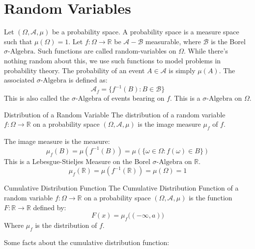 \section{Random Variables}
    Let $(\Omega,\mathcal{A},\mu)$ be a probability space.
    A probability space is a measure space such that
    $\mu(\Omega)=1$. Let $f:\Omega\rightarrow\mathbb{R}$ be
    $\mathcal{A}-\mathcal{B}$ measurable, where $\mathcal{B}$ is
    the Borel $\sigma\textrm{-Algebra}$. Such functions are called
    random-variables on $\Omega$. While there's nothing random
    about this, we use such functions to model problems in
    probability theory. The probability of an event
    $A\in\mathcal{A}$ is simply $\mu(A)$. The associated
    $\sigma\textrm{-Algebra}$ is defined as:
    \begin{equation}
        \mathcal{A}_{f}=\{f^{-1}(B):B\in\mathcal{B}\}
    \end{equation}
    This is also called the $\sigma\textrm{-Algebra}$ of events
    bearing on $f$. This is a $\sigma\textrm{-Algebra}$ on
    $\Omega$.
    \begin{ldefinition}{Distribution of a Random Variable}
        The distribution of a random variable
        $f:\Omega\rightarrow\mathbb{R}$ on a probability space
        $(\Omega,\mathcal{A},\mu)$ is the image measure
        $\mu_{f}$ of $f$.
    \end{ldefinition}
    The image measure is the measure:
    \begin{equation}
        \mu_{f}(B)=\mu(f^{-1}(B))
        =\mu(\{\omega\in\Omega:f(\omega)\in{B}\})
    \end{equation}
    This is a Lebesgue-Stieljes Measure on the Borel
    $\sigma\textrm{-Algebra}$ on $\mathbb{R}$.
    \begin{equation}
        \mu_{f}(\mathbb{R})=\mu(f^{-1}(\mathbb{R}))
        =\mu(\Omega)=1
    \end{equation}
    \begin{ldefinition}{Cumulative Distribution Function}
        The Cumulative Distribution Function of a random variable
        $f:\Omega\rightarrow\mathbb{R}$ on a probability space
        $(\Omega,\mathcal{A},\mu)$ is the function
        $F:\mathbb{R}\rightarrow\mathbb{R}$ defined by:
        \begin{equation}
            F(x)=\mu_{f}\big((-\infty,a)\big)
        \end{equation}
        Where $\mu_{f}$ is the distribution of $f$.
    \end{ldefinition}
    Some facts about the cumulative distribution function:
